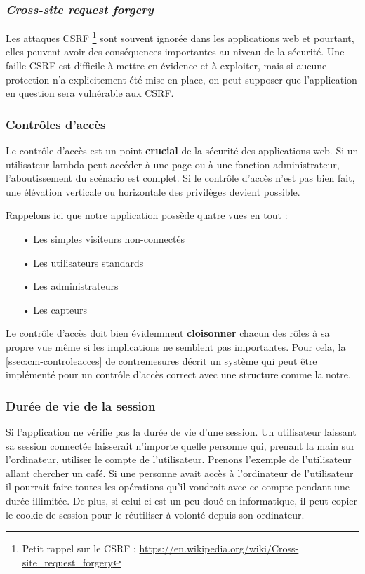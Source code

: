 \documentclass[12pt]{article}
\begin{document}
\subsubsection{\emph{Cross-site request forgery}}

Les attaques CSRF \footnote{Petit rappel sur le CSRF : \url{https://en.wikipedia.org/wiki/Cross-site_request_forgery}} sont souvent ignorée dans les applications web et pourtant, elles peuvent avoir des conséquences importantes au niveau de la sécurité. Une faille CSRF est difficile à
mettre en évidence et à exploiter, mais si aucune protection n'a explicitement été mise en place, on peut supposer que l'application en question sera vulnérable aux CSRF.

\subsubsection{Contrôles d'accès}

Le contrôle d'accès est un point \textbf{crucial} de la sécurité des applications web. Si un utilisateur lambda peut accéder à une page ou à une fonction administrateur, l'aboutissement du scénario est complet. Si le contrôle d'accès n'est pas bien fait, une élévation verticale ou horizontale des privilèges devient possible.

Rappelons ici que notre application possède quatre vues en tout :

\begin{itemize}
\item[•] Les simples visiteurs non-connectés
\item[•] Les utilisateurs standards
\item[•] Les administrateurs
\item[•] Les capteurs
\end{itemize}

Le contrôle d'accès doit bien évidemment \textbf{cloisonner} chacun des rôles à sa propre vue même si les implications ne semblent pas importantes. Pour cela, la \autoref{ssec:cm-controleacces} de contremesures décrit un système qui peut être implémenté pour un contrôle d'accès correct avec une structure comme la notre.

\subsubsection{Durée de vie de la session}

Si l'application ne vérifie pas la durée de vie d'une session. Un utilisateur laissant sa session connectée  laisserait n'importe quelle personne qui, prenant la main sur l'ordinateur, utiliser le compte de l'utilisateur.
Prenons l'exemple de l'utilisateur allant chercher un café. Si une personne avait accès à l'ordinateur de l'utilisateur il pourrait faire toutes les opérations qu'il voudrait avec ce compte pendant une durée illimitée. De plus, si celui-ci est un peu doué en informatique, il peut copier le cookie de session pour le réutiliser à volonté depuis son ordinateur.
\end{document}
